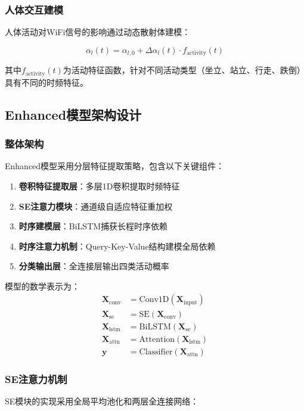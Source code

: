 \subsubsection{人体交互建模}
人体活动对WiFi信号的影响通过动态散射体建模：

\begin{equation}
\alpha_l(t) = \alpha_{l,0} + \Delta\alpha_l(t) \cdot f_{\text{activity}}(t)
\label{eq:human_interaction}
\end{equation}

其中$f_{\text{activity}}(t)$为活动特征函数，针对不同活动类型（坐立、站立、行走、跌倒）具有不同的时频特征。

\subsection{Enhanced模型架构设计}
\label{subsec:enhanced_architecture}

\subsubsection{整体架构}
Enhanced模型采用分层特征提取策略，包含以下关键组件：

\begin{enumerate}
\item \textbf{卷积特征提取层}：多层1D卷积提取时频特征
\item \textbf{SE注意力模块}：通道级自适应特征重加权
\item \textbf{时序建模层}：BiLSTM捕获长程时序依赖
\item \textbf{时序注意力机制}：Query-Key-Value结构建模全局依赖
\item \textbf{分类输出层}：全连接层输出四类活动概率
\end{enumerate}

模型的数学表示为：
\begin{align}
\mathbf{X}_{\text{conv}} &= \text{Conv1D}(\mathbf{X}_{\text{input}}) \\
\mathbf{X}_{\text{se}} &= \text{SE}(\mathbf{X}_{\text{conv}}) \\
\mathbf{X}_{\text{lstm}} &= \text{BiLSTM}(\mathbf{X}_{\text{se}}) \\
\mathbf{X}_{\text{attn}} &= \text{Attention}(\mathbf{X}_{\text{lstm}}) \\
\mathbf{y} &= \text{Classifier}(\mathbf{X}_{\text{attn}})
\end{align}

\subsubsection{SE注意力机制}
SE模块的实现采用全局平均池化和两层全连接网络：

